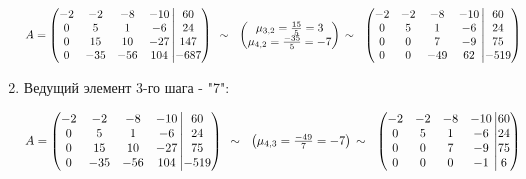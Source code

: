 \documentclass[a4paper,12pt]{article} %
\begin{document}
\begin{enumerate}
$
A = \left(\begin{matrix} 
-2 & -2 & -8 & -10\\ 
0 & 5 & 1 & -6\\ 
0 & 15 & 10 & -27\\
0 & -35 & -56 & 104 
\end{matrix}\left| 
\begin{matrix} 
60 \\ 24 \\ 147 \\ -687 
\end{matrix}\right)\right.\ 
\sim~\ 
\begin{pmatrix} 
\mu_{3,2} = \frac{15}{5} = 3\\ 
\mu_{4,2} = \frac{-35}{5} = -7
\end{pmatrix} \\
\sim~\ 
\left(\begin{matrix} 
-2 & -2 & -8 & -10\\ 
0 & 5 & 1 & -6\\ 
0 & 0 & 7 & -9\\
0 & 0 & -49 & 62 
\end{matrix}\left| 
\begin{matrix} 
60 \\ 24 \\ 75 \\ -519 
\end{matrix}\right)\right.\ 
$

\newpage

\item Ведущий элемент 3-го шага - "7":

$
A = \left(\begin{matrix} 
-2 & -2 & -8 & -10\\ 
0 & 5 & 1 & -6\\ 
0 & 15 & 10 & -27\\
0 & -35 & -56 & 104 
\end{matrix}\left| 
\begin{matrix} 
60 \\ 24 \\ 75 \\ -519 
\end{matrix}\right)\right.\ 
\sim~\ 
\begin{pmatrix} 
\mu_{4,3} = \frac{-49}{7} = -7
\end{pmatrix} \\
\sim~\ 
\left(\begin{matrix} 
-2 & -2 & -8 & -10\\ 
0 & 5 & 1 & -6\\ 
0 & 0 & 7 & -9\\
0 & 0 & 0 & -1 
\end{matrix}\left| 
\begin{matrix} 
60 \\ 24 \\ 75 \\ 6 
\end{matrix}\right)\right.\ 
$
\vspace{0.5cm}


\end{enumerate}
\end{document}
